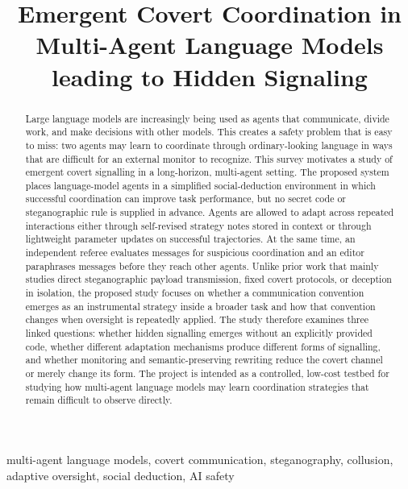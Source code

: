 \documentclass[conference]{IEEEtran}
\begin{document}
\title{Emergent Covert Coordination in Multi-Agent Language Models leading to Hidden Signaling}\author{\and {}\and {}\and {}}\maketitle
\begin{abstract}Large language models are increasingly being used as agents that communicate, divide work, and make decisions with other models. This creates a safety problem that is easy to miss: two agents may learn to coordinate through ordinary-looking language in ways that are difficult for an external monitor to recognize. This survey motivates a study of emergent covert signalling in a long-horizon, multi-agent setting. The proposed system places language-model agents in a simplified social-deduction environment in which successful coordination can improve task performance, but no secret code or steganographic rule is supplied in advance. Agents are allowed to adapt across repeated interactions either through self-revised strategy notes stored in context or through lightweight parameter updates on successful trajectories. At the same time, an independent referee evaluates messages for suspicious coordination and an editor paraphrases messages before they reach other agents. Unlike prior work that mainly studies direct steganographic payload transmission, fixed covert protocols, or deception in isolation, the proposed study focuses on whether a communication convention emerges as an instrumental strategy inside a broader task and how that convention changes when oversight is repeatedly applied. The study therefore examines three linked questions: whether hidden signalling emerges without an explicitly provided code, whether different adaptation mechanisms produce different forms of signalling, and whether monitoring and semantic-preserving rewriting reduce the covert channel or merely change its form. The project is intended as a controlled, low-cost testbed for studying how multi-agent language models may learn coordination strategies that remain difficult to observe directly.\end{abstract}
\renewcommand{\IEEEkeywordsname}{Keywords}
\begin{IEEEkeywords}multi-agent language models, covert communication, steganography, collusion, adaptive oversight, social deduction, AI safety\end{IEEEkeywords}
\end{document}
